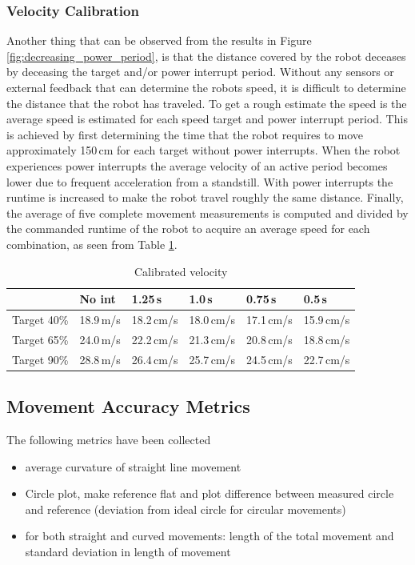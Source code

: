 \subsubsection{Velocity Calibration}
Another thing that can be observed from the results in Figure \ref{fig:decreasing_power_period}, is that the distance covered by the robot deceases by deceasing the target and/or power interrupt period.
Without any sensors or external feedback that can determine the robots speed, it is difficult to determine the distance that the robot has traveled.
To get a rough estimate the speed is the average speed is estimated for each speed target and power interrupt period.
This is achieved by first determining the time that the robot requires to move approximately 150\,cm for each target without power interrupts.
When the robot experiences power interrupts the average velocity of an active period becomes lower due to frequent acceleration from a standstill.
With power interrupts the runtime is increased to make the robot travel roughly the same distance.
Finally, the average of five complete movement measurements is computed and divided by the commanded runtime of the robot to acquire an average speed for each combination, as seen from Table \ref{tab:val_calib}.


\begin{table}[t]
	\centering
	\small
	\caption{Calibrated velocity}
	\label{tab:val_calib}
	\begin{tabular}{|l|l|l|l|l|l|}
		\hline
		& No int & 1.25\,s & 1.0\,s & 0.75\,s & 0.5\,s \\
		\hline \hline
		Target 40\% & 18.9\,m/s & 18.2\,cm/s & 18.0\,cm/s & 17.1\,cm/s & 15.9\,cm/s \\
		Target 65\% & 24.0\,m/s & 22.2\,cm/s & 21.3\,cm/s & 20.8\,cm/s & 18.8\,cm/s \\
		Target 90\% & 28.8\,m/s & 26.4\,cm/s & 25.7\,cm/s & 24.5\,cm/s & 22.7\,cm/s \\
		\hline
	\end{tabular}
\end{table}

\subsection{Movement Accuracy Metrics}
The following metrics have been collected

\begin{itemize}
	\item average curvature of straight line movement
	\item Circle plot, make reference flat and plot difference between measured circle and reference (deviation from ideal circle for circular movements)
	\item for both straight and curved movements: length of the total movement and  standard deviation in length of movement
\end{itemize}


